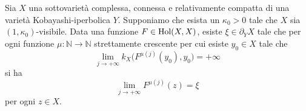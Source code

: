 \begin{prop} \label{inf_impl_ugu}
    Sia $X$ una sottovarietà complessa, connessa e relativamente compatta di una varietà Kobayashi-iperbolica $Y$. Supponiamo che esista un $\kappa_0>0$ tale che $X$ sia $(1,\kappa_0)$-visibile. Data una funzione $F\in\textnormal{Hol}(X,X)$, esiste $\xi\in\partial_YX$ tale che per ogni funzione $\mu:\mathbb{N}\longrightarrow\mathbb{N}$ strettamente crescente per cui esiste $y_0 \in X$ tale che
    \begin{equation}
        \lim_{j\longrightarrow+\infty} k_X\big(F^{\mu(j)}(y_0),y_0\big)=+\infty
    \end{equation}
    si ha
    \begin{equation}
        \lim_{j\longrightarrow+\infty} F^{\mu(j)}(z)=\xi
    \end{equation}
    per ogni $z \in X$.
\end{prop}

